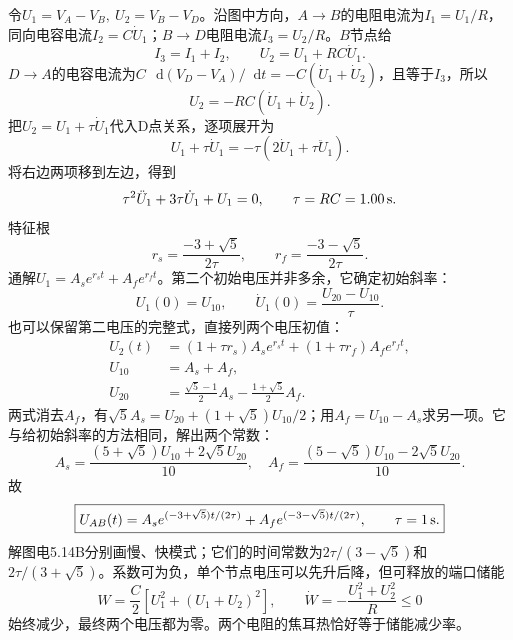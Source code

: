 \documentclass[UTF8,fontset=fandol,a4paper,11pt]{ctexart}
\newcommand{\dd}{\mathop{}\!\mathrm{d}}
\newcommand{\figcaption}[1]{\par\vspace{2pt}{\small\color{muted}#1}\par}
\begin{document}
令$U_1=V_A-V_B,\ U_2=V_B-V_D$。沿图中方向，$A\to B$的电阻电流为$I_1=U_1/R$，同向电容电流$I_2=C\dot U_1$；$B\to D$电阻电流$I_3=U_2/R$。$B$节点给
\[
 I_3=I_1+I_2,\qquad U_2=U_1+RC\dot U_1.
\]
$D\to A$的电容电流为$C\,\dd(V_D-V_A)/\dd t=-C(\dot U_1+\dot U_2)$，且等于$I_3$，所以
\[
 U_2=-RC(\dot U_1+\dot U_2).
\]
把$U_2=U_1+\tau\dot U_1$代入D点关系，逐项展开为
\[
U_1+\tau\dot U_1=-\tau(2\dot U_1+\tau\ddot U_1).
\]
将右边两项移到左边，得到
\[
 \tau^2\ddot U_1+3\tau\dot U_1+U_1=0,\qquad
 \tau=RC=1.00\,{\rm s}.
\]
特征根
\[
 r_s=\frac{-3+\sqrt5}{2\tau},\qquad
 r_f=\frac{-3-\sqrt5}{2\tau}.
\]
通解$U_1=A_s e^{r_st}+A_f e^{r_ft}$。第二个初始电压并非多余，它确定初始斜率：
\[
 U_1(0)=U_{10},\qquad
 \dot U_1(0)=\frac{U_{20}-U_{10}}{\tau}.
\]
也可以保留第二电压的完整式，直接列两个电压初值：
\[
\begin{aligned}
U_2(t)&=(1+\tau r_s)A_s e^{r_st}+(1+\tau r_f)A_f e^{r_ft},\\
U_{10}&=A_s+A_f,\\
U_{20}&=\frac{\sqrt5-1}{2}A_s-\frac{1+\sqrt5}{2}A_f.
\end{aligned}
\]
两式消去$A_f$，有$\sqrt5 A_s=U_{20}+(1+\sqrt5)U_{10}/2$；用$A_f=U_{10}-A_s$求另一项。它与给初始斜率的方法相同，解出两个常数：
\[
 A_s=\frac{(5+\sqrt5)U_{10}+2\sqrt5U_{20}}{10},\quad
 A_f=\frac{(5-\sqrt5)U_{10}-2\sqrt5U_{20}}{10}.
\]
故
\[
 \boxed{U_{AB}(t)=A_s e^{(-3+\sqrt5)t/(2\tau)}
 +A_f e^{(-3-\sqrt5)t/(2\tau)},\qquad\tau=1\,{\rm s}.}
\]
解图电5.14B分别画慢、快模式；它们的时间常数为$2\tau/(3-\sqrt5)$和$2\tau/(3+\sqrt5)$。系数可为负，单个节点电压可以先升后降，但可释放的端口储能
\[
 W=\frac C2[U_1^2+(U_1+U_2)^2],\qquad
 \dot W=-\frac{U_1^2+U_2^2}{R}\le0
\]
始终减少，最终两个电压都为零。两个电阻的焦耳热恰好等于储能减少率。

\begin{center}\begin{minipage}{.98\linewidth}\centering
{}
\figcaption{解图电5.14B\quad 一般初态由慢、快两条指数模式叠加}
\end{minipage}\end{center}
\end{document}
